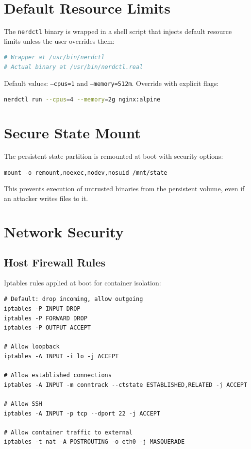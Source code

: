 \section{Default Resource Limits}

The \texttt{nerdctl} binary is wrapped in a shell script that injects
default resource limits unless the user overrides them:

\begin{lstlisting}[language=bash]
# Wrapper at /usr/bin/nerdctl
# Actual binary at /usr/bin/nerdctl.real
\end{lstlisting}

Default values: \texttt{--cpus=1} and \texttt{--memory=512m}. Override
with explicit flags:

\begin{lstlisting}[language=bash]
nerdctl run --cpus=4 --memory=2g nginx:alpine
\end{lstlisting}

\section{Secure State Mount}

The persistent state partition is remounted at boot with security
options:

\begin{lstlisting}
mount -o remount,noexec,nodev,nosuid /mnt/state
\end{lstlisting}

This prevents execution of untrusted binaries from the persistent
volume, even if an attacker writes files to it.

\section{Network Security}

\subsection{Host Firewall Rules}

Iptables rules applied at boot for container isolation:

\begin{lstlisting}
# Default: drop incoming, allow outgoing
iptables -P INPUT DROP
iptables -P FORWARD DROP
iptables -P OUTPUT ACCEPT

# Allow loopback
iptables -A INPUT -i lo -j ACCEPT

# Allow established connections
iptables -A INPUT -m conntrack --ctstate ESTABLISHED,RELATED -j ACCEPT

# Allow SSH
iptables -A INPUT -p tcp --dport 22 -j ACCEPT

# Allow container traffic to external
iptables -t nat -A POSTROUTING -o eth0 -j MASQUERADE
\end{lstlisting}

